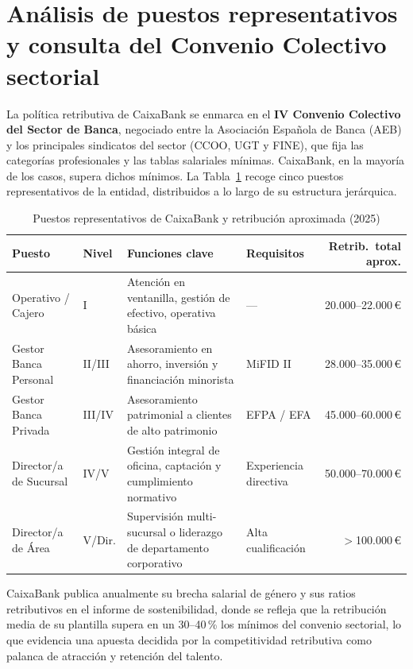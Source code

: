 \section{Análisis de puestos representativos y consulta del Convenio Colectivo sectorial}

La política retributiva de CaixaBank se enmarca en el \textbf{IV Convenio Colectivo del Sector de Banca}, negociado entre la Asociación Española de Banca (AEB) y los principales sindicatos del sector (CCOO, UGT y FINE), que fija las categorías profesionales y las tablas salariales mínimas. CaixaBank, en la mayoría de los casos, supera dichos mínimos. La Tabla~\ref{tab:puestos} recoge cinco puestos representativos de la entidad, distribuidos a lo largo de su estructura jerárquica.

\begin{table}[H]
\centering
\caption{Puestos representativos de CaixaBank y retribución aproximada (2025)}
\label{tab:puestos}
\small
\begin{tabularx}{\textwidth}{|l|l|X|X|r|}
\hline
\textbf{Puesto} & \textbf{Nivel} & \textbf{Funciones clave} & \textbf{Requisitos} & \textbf{Retrib.\ total aprox.} \\
\hline
Operativo / Cajero & I & Atención en ventanilla, gestión de efectivo, operativa básica & --- & 20.000--22.000\,\euro{} \\
\hline
Gestor Banca Personal & II/III & Asesoramiento en ahorro, inversión y financiación minorista & MiFID II & 28.000--35.000\,\euro{} \\
\hline
Gestor Banca Privada & III/IV & Asesoramiento patrimonial a clientes de alto patrimonio & EFPA / EFA & 45.000--60.000\,\euro{} \\
\hline
Director/a de Sucursal & IV/V & Gestión integral de oficina, captación y cumplimiento normativo & Experiencia directiva & 50.000--70.000\,\euro{} \\
\hline
Director/a de Área & V/Dir. & Supervisión multi-sucursal o liderazgo de departamento corporativo & Alta cualificación & $>$100.000\,\euro{} \\
\hline
\end{tabularx}
\end{table}

CaixaBank publica anualmente su brecha salarial de género y sus ratios retributivos en el informe de sostenibilidad, donde se refleja que la retribución media de su plantilla supera en un 30--40\,\% los mínimos del convenio sectorial, lo que evidencia una apuesta decidida por la competitividad retributiva como palanca de atracción y retención del talento.

